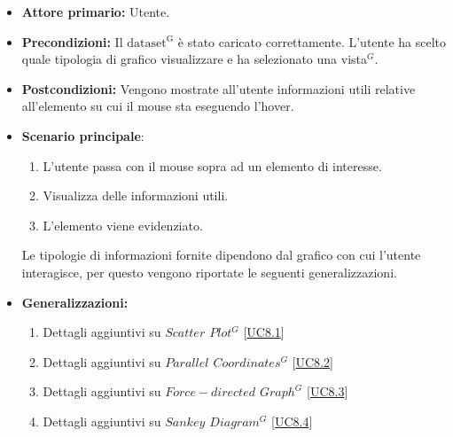\begin{itemize}
    \item \textbf{Attore primario:} Utente.
    \item \textbf{Precondizioni:} Il ${\mathrm{dataset^{G}}}$ è stato caricato correttamente. L'utente ha scelto quale tipologia di grafico visualizzare e ha selezionato una vista$^{G}$.
    \item \textbf{Postcondizioni:} Vengono mostrate all'utente informazioni utili relative all'elemento su cui il mouse sta eseguendo l'hover.
    \item \textbf{Scenario principale}: 
    \begin{enumerate}
		\item L'utente passa con il mouse sopra ad un elemento di interesse. 
		\item Visualizza delle informazioni utili.
		\item L'elemento viene evidenziato. 
	\end{enumerate}
	Le tipologie di informazioni fornite dipendono dal grafico con cui l'utente interagisce, per questo vengono riportate le seguenti generalizzazioni.
    \item \textbf{Generalizzazioni:} \begin{enumerate}
                                        \item Dettagli aggiuntivi su \textit{$Scatter$ $Plot^{G}$} [\hyperref[sec:UC8.1]{UC8.1}]
                                        \item Dettagli aggiuntivi su \textit{$Parallel$ $Coordinates^{G}$} [\hyperref[sec:UC8.2]{UC8.2}]
                                        \item Dettagli aggiuntivi su \textit{$Force-directed$ $Graph^{G}$} [\hyperref[sec:UC8.3]{UC8.3}]
                                        \item Dettagli aggiuntivi su \textit{$Sankey$ $Diagram^{G}$} [\hyperref[sec:UC8.4]{UC8.4}]
                                    \end{enumerate}
\end{itemize}

